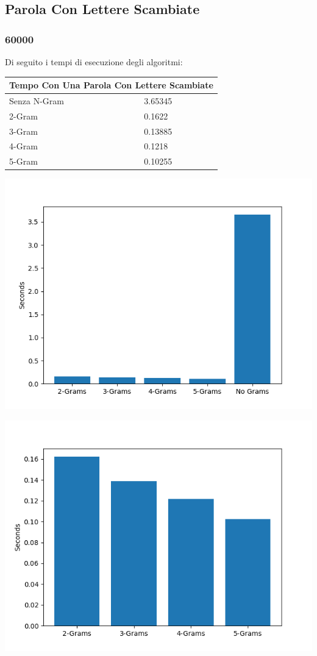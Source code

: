 \documentclass{article}
\begin{document}
\subsection{Parola Con Lettere Scambiate}
\subsubsection{60000}
Di seguito i tempi di esecuzione degli algoritmi:
\medskip

\begin{tabular}{ |p{3cm}||p{3.5cm}|  }
 \hline
 \multicolumn{2}{|c|}{Tempo Con Una Parola Con Lettere Scambiate} \\
\hline
 Senza N-Gram  &   3.65345\\\hline
 2-Gram &  0.1622    \\\hline
 3-Gram & 0.13885 \\\hline
 4-Gram & 0.1218\\\hline
 5-Gram & 0.10255  \\
 \hline
\end{tabular}

\includegraphics[scale=0.5]{img/LetteraScambiata_60000_parole.png}

\includegraphics[scale=0.5]{img/LetteraScambiataSoloGram_60000_parole.png}
\end{document}
